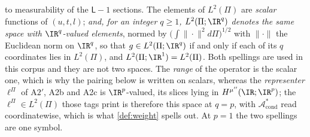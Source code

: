 \begin{definition}
to measurability of the $\mathsf L-1$ sections.
The elements of $L^{2}(\Pi)$ are
\emph{scalar} functions of $(u,t,l)$; \emph{and, for an integer $q\ge1$, $L^{2}(\Pi;\IR^{q})$ denotes the
same space with $\IR^{q}$-valued elements}, normed by $\big(\int\|\cdot\|^{2}d\Pi\big)^{1/2}$ with
$\|\cdot\|$ the Euclidean norm on $\IR^{q}$, so that $g\in L^{2}(\Pi;\IR^{q})$ if and only if each of its
$q$ coordinates lies in $L^{2}(\Pi)$, and $L^{2}(\Pi;\IR^{1})=L^{2}(\Pi)$. Both spellings are used
in this corpus and they are not two spaces. The \emph{range} of the operator is the scalar one, 
which is why the pairing below is written on scalars, whereas the \emph{representer} $\ell^\Pi$ of A$2'$, A2b and A2c is
$\IR^{p}$-valued, its slices lying in $H^{\mu''}(\IR;\IR^{p})$; the $\ell^\Pi\in L^{2}(\Pi)$ those tags
print is therefore this space at $q=p$, with $\mathcal A^\ast_{\mathrm{cond}}$ read coordinatewise, which
is what \cref{def:weight} spells out. At $p=1$ the two spellings are one symbol.

\end{definition}
